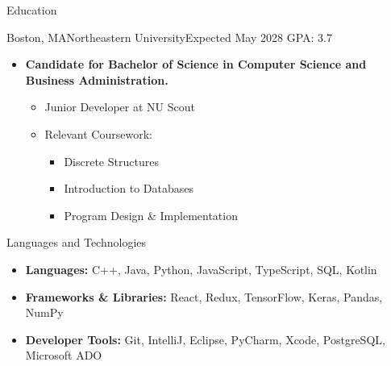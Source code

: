 \documentclass[]{mcdowellcv}
\begin{document}
	\makeheader
	\begin{cvsection}{Education}
		\begin{cvsubsection}{Boston, MA}{Northeastern University}{Expected May 2028 \linebreak GPA: 3.7}
			\begin{itemize}
				\item  \textbf{Candidate for Bachelor of Science in Computer Science and Business Administration.}
				\begin{itemize}
					\item Junior Developer at NU Scout
					\item Relevant Coursework:
					\begin{itemize}
						\item Discrete Structures
						\item Introduction to Databases	
						\item Program Design \& Implementation
					\end{itemize}
				\end{itemize}
			\end{itemize}
		\end{cvsubsection}
	\end{cvsection}
		\begin{cvsection}{Languages and Technologies}
		\begin{cvsubsection}{}{}{}	
			\begin{itemize}
				\item \textbf{Languages:} C++, Java, Python, JavaScript, TypeScript, SQL, Kotlin
				\item \textbf{Frameworks \& Libraries:} React, Redux, TensorFlow, Keras, Pandas, NumPy
				\item \textbf{Developer Tools:} Git, IntelliJ, Eclipse, PyCharm, Xcode, PostgreSQL, Microsoft ADO
			\end{itemize}
		\end{cvsubsection}
	\end{cvsection}
\end{document}
